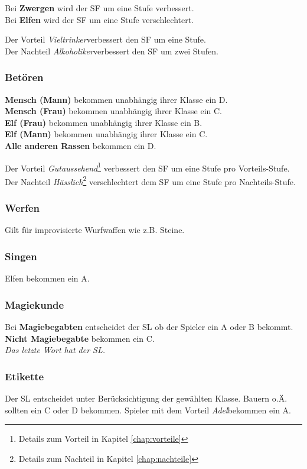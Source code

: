 Bei \textbf{Zwergen} wird der SF um eine Stufe verbessert. \\
Bei \textbf{Elfen} wird der SF um eine Stufe verschlechtert. 

Der Vorteil \textit{Vieltrinker}\footnotemark[4] verbessert den SF um eine Stufe. \\
Der Nachteil \textit{Alkoholiker}\footnotemark[5] verbessert den SF um zwei Stufen. 

\subsubsection{Betören}
\textbf{Mensch (Mann)} bekommen unabhängig ihrer Klasse ein D. \\
\textbf{Mensch (Frau)} bekommen unabhängig ihrer Klasse ein C. \\
\textbf{Elf (Frau)} bekommen unabhängig ihrer Klasse ein B. \\
\textbf{Elf (Mann)} bekommen unabhängig ihrer Klasse ein C. \\
\textbf{Alle anderen Rassen} bekommen ein D. 

Der Vorteil \textit{Gutaussehend}\footnote{Details zum Vorteil in Kapitel \ref{chap:vorteile}} verbessert den SF um eine Stufe pro Vorteils-Stufe. \\
Der Nachteil \textit{Hässlich}\footnote{Details zum Nachteil in Kapitel \ref{chap:nachteile}} verschlechtert dem SF um eine Stufe pro Nachteils-Stufe. 

\subsubsection{Werfen}
Gilt für improvisierte Wurfwaffen wie z.B. Steine.

\subsubsection{Singen}
Elfen bekommen ein A.

\subsubsection{Magiekunde}
Bei \textbf{Magiebegabten} entscheidet der SL ob der Spieler ein A oder B bekommt. \\
\textbf{Nicht Magiebegabte} bekommen ein C. \\
\textit{Das letzte Wort hat der SL.}

\subsubsection{Etikette}
Der SL entscheidet unter Berücksichtigung der gewählten Klasse. Bauern o.Ä. sollten ein C oder D bekommen. Spieler mit dem Vorteil \textit{Adel}\footnotemark[4] bekommen ein A.

